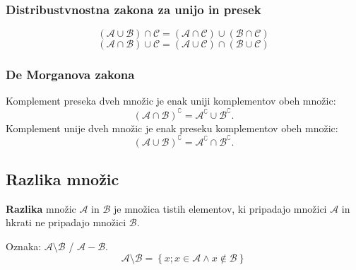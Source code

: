                 \subsubsection{Distribustvnostna zakona za unijo in presek}
        $$ \left(\mathcal{A}\cup\mathcal{B}\right)\cap\mathcal{C}=\left(\mathcal{A}\cap\mathcal{C}\right)\cup\left(\mathcal{B}\cap\mathcal{C}\right) $$
        $$ \left(\mathcal{A}\cap\mathcal{B}\right)\cup\mathcal{C}=\left(\mathcal{A}\cup\mathcal{C}\right)\cap\left(\mathcal{B}\cup\mathcal{C}\right) $$
    

        \subsubsection{De Morganova zakona}
        Komplement preseka dveh množic je enak uniji komplementov obeh množic:
        $$\left(\mathcal{A}\cap\mathcal{B}\right)^\complement=\mathcal{A}^\complement\cup\mathcal{B}^\complement. $$
        Komplement unije dveh množic je enak preseku komplementov obeh množic:
        $$\left(\mathcal{A}\cup\mathcal{B}\right)^\complement=\mathcal{A}^\complement\cap\mathcal{B}^\complement. $$
    



    
    

            \subsection{Razlika množic}
                \textbf{Razlika} množic $\mathcal{A}$ in $\mathcal{B}$ je množica tistih elementov, ki  
                pripadajo množici $\mathcal{A}$ in hkrati ne pripadajo množici $\mathcal{B}$.

                Oznaka: $\mathbf{\mathcal{A}\setminus\mathcal{B}}$ / $\mathbf{\mathcal{A}-\mathcal{B}}$.
                $$ \mathcal{A}\setminus\mathcal{B}=\left\{x; x\in\mathcal{A}\land x\notin\mathcal{B}\right\} $$
            

            
            


